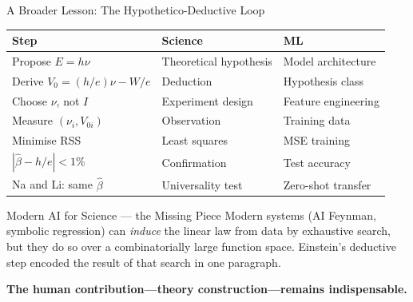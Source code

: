 \documentclass[aspectratio=169,12pt]{beamer}
\begin{document}
\begin{frame}[shrink=5]{A Broader Lesson: The Hypothetico-Deductive Loop}

\begin{center}
\small
\renewcommand{\arraystretch}{1.25}
\begin{tabular}{p{4.0cm}p{4.0cm}p{4.0cm}}
\toprule
\textbf{Step} & \textbf{Science} & \textbf{ML} \\
\midrule
Propose $E = h\nu$              & Theoretical hypothesis & Model architecture \\
Derive $V_0 = (h/e)\nu - W/e$   & Deduction              & Hypothesis class \\
Choose $\nu$, not $I$           & Experiment design      & Feature engineering \\
Measure $(\nu_i, V_{0i})$       & Observation            & Training data \\
Minimise RSS                    & Least squares          & MSE training \\
$|\hat\beta - h/e| < 1\%$       & Confirmation           & Test accuracy \\
Na and Li: same $\hat\beta$     & Universality test      & Zero-shot transfer \\
\bottomrule
\end{tabular}
\end{center}

\bigskip
\begin{block}{Modern AI for Science --- the Missing Piece}
Modern systems (AI Feynman, symbolic regression) can \emph{induce} the
linear law from data by exhaustive search, but they do so over a
combinatorially large function space.  Einstein's deductive step
encoded the result of that search in one paragraph.

\smallskip
\textbf{The human contribution---theory construction---remains
indispensable.}
\end{block}

\end{frame}
\end{document}
